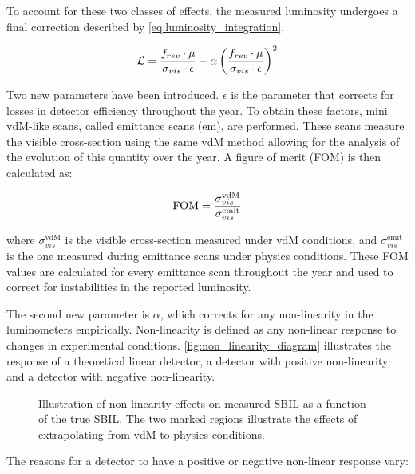 To account for these two classes of effects, the measured luminosity undergoes a final correction described by \autoref{eq:luminosity_integration}.

\begin{equation}
    \centering
    \mathcal{L} = \frac{f_{rev} \cdot \mu}{\sigma_{vis} \cdot \epsilon} - \alpha \left( \frac{f_{rev} \cdot \mu}{\sigma_{vis} \cdot \epsilon} \right)^{2}
    \label{eq:luminosity_integration}
\end{equation}

Two new parameters have been introduced. \(\epsilon\) is the parameter that corrects for losses in detector efficiency throughout the year. To obtain these factors, mini vdM-like scans, called emittance scans (em), are performed. These scans measure the visible cross-section using the same vdM method allowing for the analysis of the evolution of this quantity over the year. A figure of merit (FOM) is then calculated as:

\begin{equation}
    \centering
    \text{FOM} = \frac{\sigma^{\text{vdM}}_{vis}}{\sigma^{\text{emit}}_{vis}}
    \label{eq:figure_of_merit}
\end{equation}

where \(\sigma^{\text{vdM}}_{vis}\) is the visible cross-section measured under vdM conditions, and \(\sigma^{\text{emit}}_{vis}\) is the one measured during emittance scans under physics conditions. These FOM values are calculated for every emittance scan throughout the year and used to correct for instabilities in the reported luminosity.

The second new parameter is \(\alpha\), which corrects for any non-linearity in the luminometers empirically. Non-linearity is defined as any non-linear response to changes in experimental conditions. \autoref{fig:non_linearity_diagram} illustrates the response of a theoretical linear detector, a detector with positive non-linearity, and a detector with negative non-linearity.

\begin{figure}[!htb]
    \centering
    \caption{Illustration of non-linearity effects on measured SBIL as a function of the true SBIL. The two marked regions illustrate the effects of extrapolating from vdM to physics conditions.}
    \label{fig:non_linearity_diagram}
\end{figure}

The reasons for a detector to have a positive or negative non-linear response vary:

